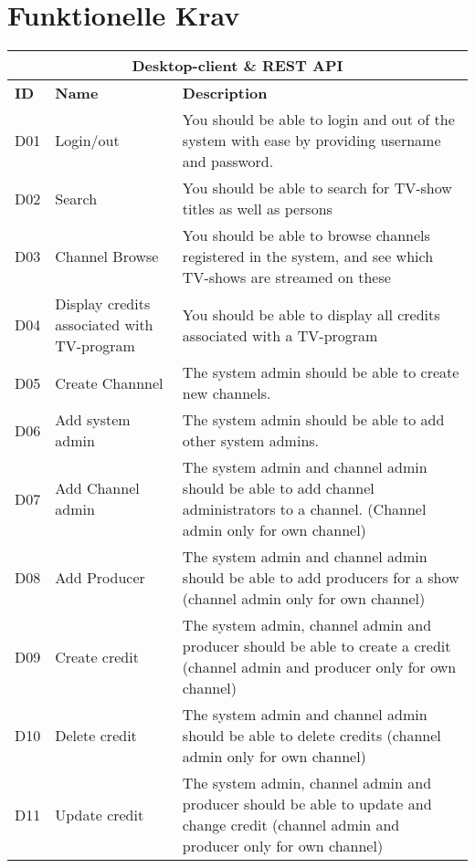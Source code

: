 \section{Funktionelle Krav} \label{funktionelle_krav}

\begin{longtable}{|p{1cm}|p{3.5cm}|p{11cm}|} 
    \hline
    \multicolumn{3}{|c|}{ \textbf{Desktop-client \& REST API}}  \\ 
    \hline
    \textbf{ID} & \textbf{Name} & \textbf{Description} \\
    \hline
    D01 & Login/out & You should be able to login and out of the system with ease by providing username and password. \\
    \hline
    D02 & Search & You should be able to search for TV-show titles as well as persons \\
    \hline
    D03 & Channel Browse & You should be able to browse channels registered in the system, and see which TV-shows are streamed on these \\
    \hline
    D04 & Display credits associated with TV-program & You should be able to display all credits associated with a TV-program \\
    \hline
    D05 & Create Channnel & The system admin should be able to create new channels. \\
    \hline
    D06 & Add system admin & The system admin should be able to add other system admins. \\
    \hline
    D07 & Add Channel admin & The system admin and channel admin should be able to add channel administrators to a channel. (Channel admin only for own channel) \\
    \hline
    D08 & Add Producer & The system admin and channel admin should be able to add producers for a show (channel admin only for own channel) \\
    \hline
    D09 & Create credit & The system admin, channel admin and producer should be able to create a credit (channel admin and producer only for own channel) \\
    \hline
    D10 & Delete credit & The system admin and channel admin should be able to delete credits (channel admin only for own channel) \\
    \hline
    D11 & Update credit & The system admin, channel admin and producer should be able to update and change credit (channel admin and producer only for own channel) \\

\end{longtable}
